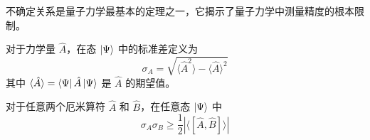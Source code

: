 不确定关系是量子力学最基本的定理之一，它揭示了量子力学中测量精度的根本限制。

\begin{definition}[标准差]
    对于力学量 $\hat{A}$，在态 $\ket{\Psi}$ 中的标准差定义为
    \begin{equation}
        \sigma_A = \sqrt{\langle \hat{A}^2 \rangle - \langle \hat{A} \rangle^2}
    \end{equation}
    其中 $\langle \hat{A} \rangle = \bra{\Psi}\hat{A}\ket{\Psi}$ 是 $\hat{A}$ 的期望值。
\end{definition}

\begin{theorem}
    对于任意两个厄米算符 $\hat{A}$ 和 $\hat{B}$，在任意态 $\ket{\Psi}$ 中
    \begin{equation}
        \sigma_A \sigma_B \geqslant \frac{1}{2}\left|\langle [\hat{A}, \hat{B}] \rangle\right|
    \end{equation}
\end{theorem}

